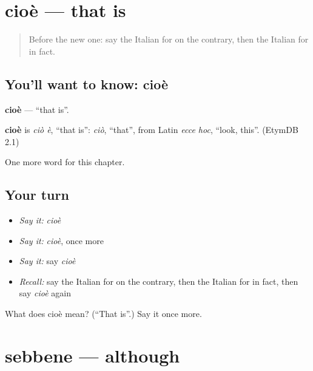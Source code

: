 \section[cioè]{cioè — that is}

\label{lesson:IT-C188-cioe}



\begin{quote}
Before the new one: say the Italian for on the contrary, then the Italian for in fact.
\end{quote}

\subsection*{You'll want to know: cioè}
\textbf{cioè} — \textquotedblleft{}that is\textquotedblright{}.

\begin{cousinweb}
\textbf{cioè} is \emph{ciò è}, \textquotedblleft{}that is\textquotedblright{}: \emph{ciò}, \textquotedblleft{}that\textquotedblright{}, from Latin \emph{ecce hoc}, \textquotedblleft{}look, this\textquotedblright{}. (EtymDB 2.1)
\end{cousinweb}

\begin{grammarlens}[title={What you've built}]
One more word for this chapter.
\end{grammarlens}

\subsection*{Your turn}
\begin{itemize}
\raggedright
  \item \emph{Say it:} \emph{cioè}
  \item \emph{Say it:} \emph{cioè}, once more
  \item \emph{Say it:} say \emph{cioè}
  \item \emph{Recall:} say the Italian for on the contrary, then the Italian for in fact, then say \emph{cioè} again
\end{itemize}

\begin{tcolorbox}[breakable,colback=teal!4,colframe=teal!35!black,title={Before you move on}]
What does cioè mean? (\textquotedblleft{}That is\textquotedblright{}.) Say it once more.
\end{tcolorbox}
\section[sebbene]{sebbene — although}

